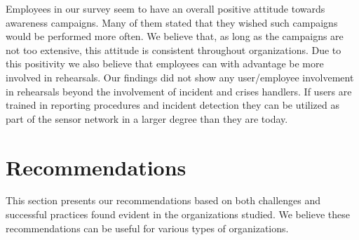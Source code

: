 Employees in our survey seem to have an overall positive attitude towards awareness campaigns. Many of them stated that they wished such campaigns would be performed more often. We believe that, as long as the campaigns are not too extensive, this attitude is consistent throughout organizations. Due to this positivity we also believe that employees can with advantage be more involved in rehearsals. Our findings did not show any user/employee involvement in rehearsals beyond the involvement of incident and crises handlers. If users are trained in reporting procedures and incident detection they can be utilized as part of the sensor network in a larger degree than they are today.

\section{Recommendations}
\label{sec:rec}
This section presents our recommendations based on both challenges and successful practices found evident in the organizations studied. We believe these recommendations can be useful for various types of organizations.

